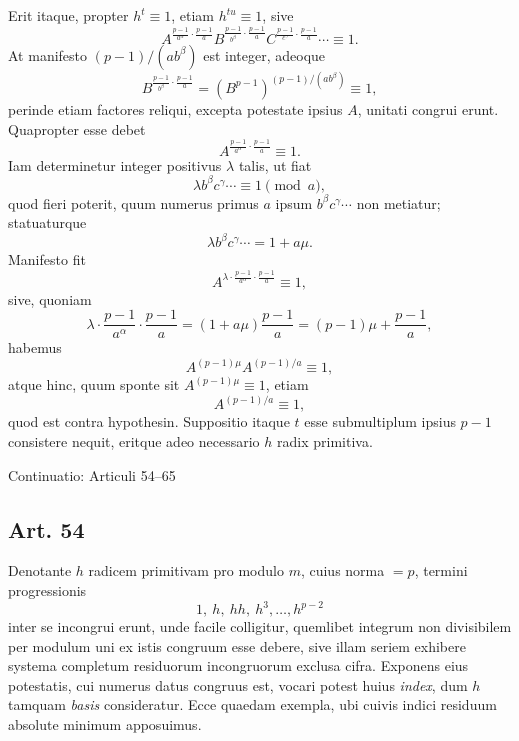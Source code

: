 \documentclass[12pt]{article}
\newcommand{\art}[1]{\subsection*{Art. #1}}
\begin{document}
Erit itaque, propter $h^t\equiv1$, etiam $h^{tu}\equiv1$, sive
\[
A^{\frac{p-1}{a^\alpha}\cdot\frac{p-1}{a}}
B^{\frac{p-1}{b^\beta}\cdot\frac{p-1}{a}}
C^{\frac{p-1}{c^\gamma}\cdot\frac{p-1}{a}}
\cdots\equiv1.
\]
At manifesto $(p-1)/(ab^\beta)$ est integer, adeoque
\[
B^{\frac{p-1}{b^\beta}\cdot\frac{p-1}{a}}
=(B^{p-1})^{(p-1)/(ab^\beta)}\equiv1,
\]
perinde etiam factores reliqui, excepta potestate ipsius $A$, unitati congrui erunt. Quapropter esse debet
\[
A^{\frac{p-1}{a^\alpha}\cdot\frac{p-1}{a}}\equiv1.
\]
Iam determinetur integer positivus $\lambda$ talis, ut fiat
\[
\lambda b^\beta c^\gamma\cdots\equiv1\pmod a,
\]
quod fieri poterit, quum numerus primus $a$ ipsum $b^\beta c^\gamma\cdots$ non metiatur; statuaturque
\[
\lambda b^\beta c^\gamma\cdots=1+a\mu.
\]
Manifesto fit
\[
A^{\lambda\cdot\frac{p-1}{a^\alpha}\cdot\frac{p-1}{a}}\equiv1,
\]
sive, quoniam
\[
\lambda\cdot\frac{p-1}{a^\alpha}\cdot\frac{p-1}{a}
=(1+a\mu)\frac{p-1}{a}=(p-1)\mu+\frac{p-1}{a},
\]
habemus
\[
A^{(p-1)\mu}A^{(p-1)/a}\equiv1,
\]
atque hinc, quum sponte sit $A^{(p-1)\mu}\equiv1$, etiam
\[
A^{(p-1)/a}\equiv1,
\]
quod est contra hypothesin. Suppositio itaque $t$ esse submultiplum ipsius $p-1$ consistere nequit, eritque adeo necessario $h$ radix primitiva.


\bigskip
\begin{center}{\large Continuatio: Articuli 54--65}\end{center}

\art{54}
Denotante $h$ radicem primitivam pro modulo $m$, cuius norma $=p$, termini progressionis
\[
1,\ h,\ hh,\ h^3,\ldots,h^{p-2}
\]
inter se incongrui erunt, unde facile colligitur, quemlibet integrum non divisibilem per modulum uni ex istis congruum esse debere, sive illam seriem exhibere systema completum residuorum incongruorum exclusa cifra. Exponens eius potestatis, cui numerus datus congruus est, vocari potest huius \textit{index}, dum $h$ tamquam \textit{basis} consideratur. Ecce quaedam exempla, ubi cuivis indici residuum absolute minimum apposuimus.
\end{document}
